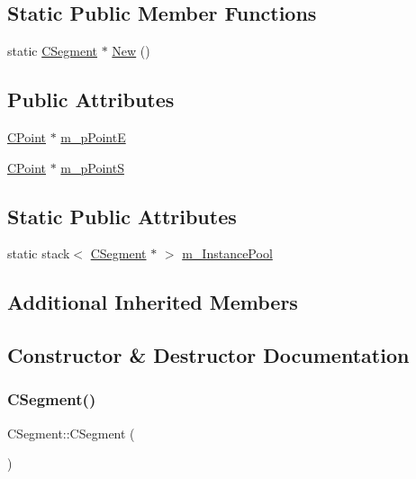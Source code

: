 \subsection*{Static Public Member Functions}
\begin{DoxyCompactItemize}
\item 
static \mbox{\hyperlink{classCSegment}{C\+Segment}} $\ast$ \mbox{\hyperlink{classCSegment_a0378c7235e713d4bac11d50728b87b6d}{New}} ()
\end{DoxyCompactItemize}
\subsection*{Public Attributes}
\begin{DoxyCompactItemize}
\item 
\mbox{\hyperlink{classCPoint}{C\+Point}} $\ast$ \mbox{\hyperlink{classCSegment_a5180095ea175f47e4cb88d21ad5928f9}{m\+\_\+p\+PointE}}
\item 
\mbox{\hyperlink{classCPoint}{C\+Point}} $\ast$ \mbox{\hyperlink{classCSegment_a832233537e6199058e184bbe09f10e05}{m\+\_\+p\+PointS}}
\end{DoxyCompactItemize}
\subsection*{Static Public Attributes}
\begin{DoxyCompactItemize}
\item 
static stack$<$ \mbox{\hyperlink{classCSegment}{C\+Segment}} $\ast$ $>$ \mbox{\hyperlink{classCSegment_aaa7f80d4e6346da4eafd833e552a291f}{m\+\_\+\+Instance\+Pool}}
\end{DoxyCompactItemize}
\subsection*{Additional Inherited Members}


\subsection{Constructor \& Destructor Documentation}
\mbox{\label{classCSegment_a927fa31ee00562e3ca35b2fdf1194319}} 
\subsubsection{\texorpdfstring{CSegment()}{CSegment()}}
{\footnotesize\ttfamily C\+Segment\+::\+C\+Segment (\begin{DoxyParamCaption}{ }\end{DoxyParamCaption})}

